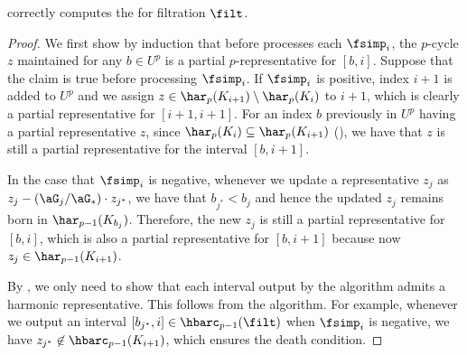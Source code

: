 \begin{theorem}
 correctly computes the {\hcb} for filtration $\filt$.
\end{theorem}
\begin{proof}
We first show by induction that before  processes each $\fsimp_i$, the $p$-cycle $z$ maintained for any $b\in U^p$ is a partial $p$-representative for $[b,i]$.
Suppose that the claim is true before processing $\fsimp_i$.
If $\fsimp_i$ is positive, index $i+1$ is added to $U^p$ and we assign $z \in\har_p(K_{i+1})\setminus\har_p(K_i)$ to $i+1$, which is clearly a partial representative for $[i+1,i+1]$.
For an index $b$ previously in $U^p$ having a partial representative $z$, since $\har_p(K_i)\subseteq \har_p(K_{i+1})$ (), we have that $z$ is still a partial representative for the interval $[b,i+1]$.

In the case that $\fsimp_i$ is negative, whenever we update a representative $z_j$ as $z_j-(\aG_j/\aG_*)\cdot z_{j^*}$, we have that $b_{j^*}<b_j$ and hence the updated $z_j$ remains born in $\har_{p-1}(K_{b_j})$. Therefore, the new $z_j$ is still a partial representative for $[b,i]$, which is also a partial representative for $[b,i+1]$ because now $z_j\in\har_{p-1}(K_{i+1})$.

By , we only need to show that each interval output by the algorithm admits a harmonic representative.
This follows from the algorithm. 
For example, whenever we output an interval $[b_{j^*},i]\in\hbarc_{p-1}(\filt)$ when $\fsimp_i$ is negative, we have $z_{j^*}\not\in\hbarc_{p-1}(K_{i+1})$, which ensures the death condition.
\end{proof}


% 
\let\mbeg\[
\let\mend\]



